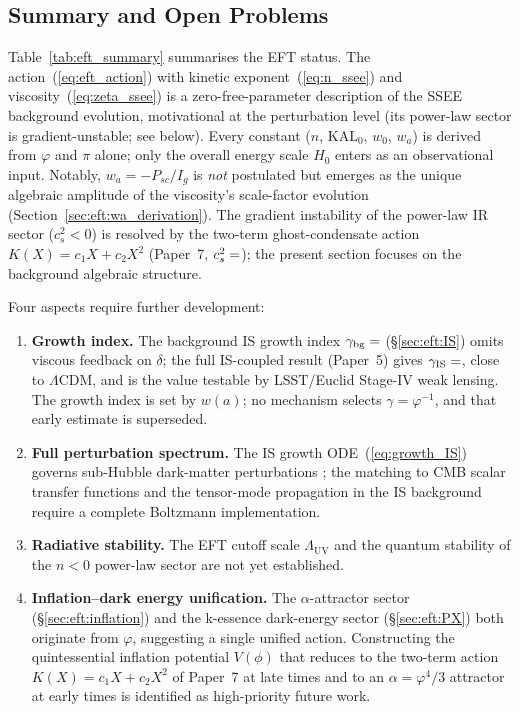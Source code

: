 \subsection{Summary and Open Problems}
\label{sec:eft:status}

Table~\ref{tab:eft_summary} summarises the EFT status.
The action~(\ref{eq:eft_action}) with kinetic exponent~(\ref{eq:n_ssee})
and viscosity~(\ref{eq:zeta_ssee}) is a zero-free-parameter description of the
SSEE background evolution, motivational at the perturbation level (its
power-law sector is gradient-unstable; see below).
Every constant ($n$, $\mathrm{KAL}_{0}$, $w_0$, $w_a$) is
derived from $\varphi$ and $\pi$ alone; only the overall energy scale $H_{0}$
enters as an observational input.  Notably, $w_a = -P_{sc}/I_g$ is
\emph{not} postulated but emerges as the unique algebraic amplitude
of the viscosity's scale-factor evolution
(Section~\ref{sec:eft:wa_derivation}).
The gradient instability of the power-law IR sector ($c_s^2<0$) is
resolved by the two-term ghost-condensate action $K(X)=c_1X+c_2X^2$ (Paper~7, $c_s^2=\val{cs2_condensado_d6}$);
the present section focuses on the background algebraic structure.

Four aspects require further development:
%
\begin{enumerate}
  \item \textbf{Growth index.}
        The background IS growth index $\gamma_{\mathrm{bg}} = \val{gammabg_c}$
        (\S\ref{sec:eft:IS}) omits viscous feedback on $\delta$; the full
        IS-coupled result (Paper~5) gives $\gamma_{\mathrm{IS}} = \val{p3_gamma_IS}$,
        close to $\Lambda$CDM, and is the value testable by LSST/Euclid
        Stage-IV weak lensing. The growth index is set by $w(a)$; no mechanism
        selects $\gamma=\varphi^{-1}$, and that early estimate is superseded.

  \item \textbf{Full perturbation spectrum.}
        The IS growth ODE~(\ref{eq:growth_IS}) governs sub-Hubble dark-matter
        perturbations \citep{Mukhanov1992}; the matching to CMB scalar transfer functions and
        the tensor-mode propagation in the IS background require a complete
        Boltzmann implementation.

  \item \textbf{Radiative stability.}
        The EFT cutoff scale $\Lambda_{\mathrm{UV}}$ and the quantum stability
        of the $n < 0$ power-law sector are not yet established.

  \item \textbf{Inflation--dark energy unification.}
        The $\alpha$-attractor sector (\S\ref{sec:eft:inflation}) and the
        k-essence dark-energy sector (\S\ref{sec:eft:PX}) both originate
        from $\varphi$, suggesting a single unified action.
        Constructing the quintessential inflation potential $V(\phi)$
        that reduces to the two-term action $K(X)=c_1X+c_2X^2$ of Paper~7 at late times
        and to an $\alpha=\varphi^4/3$ attractor at early times
        is identified as high-priority future work.
\end{enumerate}

